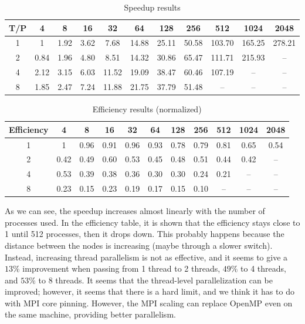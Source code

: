\documentclass[10pt]{article}
\begin{document}
\begin{multicols}{2}
\begin{table}[H]
\centering
\tiny
\setlength{\tabcolsep}{3pt}
\begin{tabular}{|c|*{10}{c}|}
  \hline
  T/P & 4 & 8 & 16 & 32 & 64 & 128 & 256 & 512 & 1024 & 2048 \\
  \hline
  1 & 1 & 1.92 & 3.62 & 7.68 & 14.88 & 25.11 & 50.58 & 103.70 & 165.25 & 278.21 \\
  2 & 0.84 & 1.96 & 4.80 & 8.51 & 14.32 & 30.86 & 65.47 & 111.71 & 215.93 & -- \\
  4 & 2.12 & 3.15 & 6.03 & 11.52 & 19.09 & 38.47 & 60.46 & 107.19 & -- & -- \\
  8 & 1.85 & 2.47 & 7.24 & 11.88 & 21.75 & 37.79 & 51.48 & -- & -- & -- \\
  \hline
\end{tabular}
\caption{Speedup results}
\label{speedup_results}
\end{table}
\begin{table}[H]
\centering
\tiny
\setlength{\tabcolsep}{3pt}
\begin{tabular}{|c|*{10}{c}|}
  \hline
  Efficiency & 4 & 8 & 16 & 32 & 64 & 128 & 256 & 512 & 1024 & 2048 \\
  \hline
  1 & 1 & 0.96 & 0.91 & 0.96 & 0.93 & 0.78 & 0.79 & 0.81 & 0.65 & 0.54 \\
  2 & 0.42 & 0.49 & 0.60 & 0.53 & 0.45 & 0.48 & 0.51 & 0.44 & 0.42 & -- \\
  4 & 0.53 & 0.39 & 0.38 & 0.36 & 0.30 & 0.30 & 0.24 & 0.21 & -- & -- \\
  8 & 0.23 & 0.15 & 0.23 & 0.19 & 0.17 & 0.15 & 0.10 & -- & -- & -- \\
  \hline
\end{tabular}
\caption{Efficiency results (normalized)}
\label{efficiency_results_normalized}
\end{table}



As we can see, the speedup increases almost linearly with the number of processes used. In the efficiency table, it is shown that the efficiency stays close to 1 until 512 processes, then it drops down. This probably happens because the distance between the nodes is increasing (maybe through a slower switch).
Instead, increasing thread parallelism is not as effective, and it seems to give a $13\%$ improvement when passing from 1 thread to 2 threads, $49\%$ to 4 threads, and $53\%$ to 8 threads.
It seems that the thread-level parallelization can be improved; however, it seems that there is a hard limit, and we think it has to do with MPI core pinning.
However, the MPI scaling can replace OpenMP even on the same machine, providing better parallelism.




\end{multicols}
\end{document}

